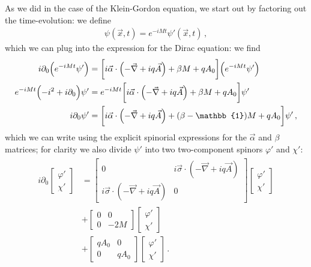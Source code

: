 \documentclass[main.tex]{subfiles}
\begin{document}
As we did in the case of the Klein-Gordon equation, we start out by factoring out the time-evolution: we define 
%
\begin{align}
\psi (\vec{x}, t) = e^{-i M t} \psi' (\vec{x}, t)
\,,
\end{align}
%
which we can plug into the expression for the Dirac equation: we find 
%
\begin{subequations}
\begin{align}
i \partial_0 \qty(e^{-iMt} \psi ') &= \qty[i \vec{\alpha} \cdot \qty(- \vec{\nabla} + i q \vec{A}) + \beta M + q A_0 ] \qty(e^{-iMt} \psi')  \\
e^{-iMt } \qty(- i^2 + i \partial_0 ) \psi' &=
e^{-iMt} \qty[i \vec{\alpha} \cdot \qty(- \vec{\nabla} + i q \vec{A}) + \beta M + q A_0 ] \psi'  \\
i \partial_0 \psi' &= \qty[i \vec{\alpha} \cdot \qty(- \vec{\nabla} + i q \vec{A}) + (\beta - \mathbb{1}) M + q A_0 ] \psi'
\,,
\end{align}
\end{subequations}
%
which we can write using the explicit spinorial expressions for the \(\vec{\alpha}\) and \(\beta \) matrices; for clarity we also divide \(\psi '\) into two two-component spinors \(\varphi'\) and \(\chi '\):
%
\begin{subequations}
\begin{align}
\begin{split}
i \partial_0 
\left[\begin{array}{c}
\varphi' \\ 
\chi '
\end{array}\right]
 &= 
\left[\begin{array}{cc}
0 & i \vec{\sigma} \cdot (-\vec{\nabla} + i q \vec{A})  \\ 
i \vec{\sigma} \cdot (-\vec{\nabla} + i q \vec{A}) & 0
\end{array}\right]
\left[\begin{array}{c}
    \varphi' \\ 
    \chi '
\end{array}\right] \\
&
+ \left[\begin{array}{cc}
0 & 0 \\ 
0 & -2M
\end{array}\right] \left[\begin{array}{c}
\varphi' \\ 
\chi '
\end{array}\right]
\\
&
+ \left[\begin{array}{cc}
qA_0  & 0 \\ 
0 & q A_0 
\end{array}\right] \left[\begin{array}{c}
\varphi' \\ 
\chi '
\end{array}\right]
\,.
\end{split}
\end{align}
\end{subequations}
\end{document}
